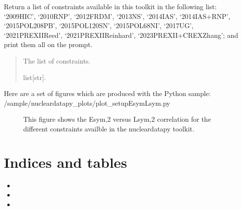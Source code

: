 \documentclass[letterpaper,10pt,english]{sphinxmanual}
\begin{document}

\begin{fulllineitems}
\label{\detokenize{source/api/setup_EsymLsym:nucleardatapy.setup_EsymLsym.constraints_EsymLsym}}
\pysigstartsignatures
{}
\pysigstopsignatures
\sphinxAtStartPar
Return a list of constraints available in this toolkit in the     following list: ‘2009\sphinxhyphen{}HIC’, ‘2010\sphinxhyphen{}RNP’, ‘2012\sphinxhyphen{}FRDM’, ‘2013\sphinxhyphen{}NS’,     ‘2014\sphinxhyphen{}IAS’, ‘2014\sphinxhyphen{}IAS+RNP’, ‘2015\sphinxhyphen{}POL\sphinxhyphen{}208PB’, ‘2015\sphinxhyphen{}POL\sphinxhyphen{}120SN’,     ‘2015\sphinxhyphen{}POL\sphinxhyphen{}68NI’, ‘2017\sphinxhyphen{}UG’, ‘2021\sphinxhyphen{}PREXII\sphinxhyphen{}Reed’,     ‘2021\sphinxhyphen{}PREXII\sphinxhyphen{}Reinhard’, ‘2023\sphinxhyphen{}PREXII+CREX\sphinxhyphen{}Zhang’; and     print them all on the prompt.
\begin{quote}\begin{description}
\sphinxAtStartPar
The list of constraints.

\sphinxAtStartPar
list{[}str{]}.

\end{description}\end{quote}

\end{fulllineitems}


\sphinxAtStartPar
Here are a set of figures which are produced with the Python sample: /sample/nucleardatapy\_plots/plot\_setupEsymLsym.py

\begin{figure}[htbp]
\centering
\capstart

\noindent{}
\caption{This figure shows the Esym,2 versus Lsym,2 correlation for the different constraints availble in the nucleardatapy toolkit.}\label{\detokenize{source/api/setup_EsymLsym:id1}}\end{figure}


\chapter{Indices and tables}
\label{\detokenize{index:indices-and-tables}}\begin{itemize}
\item {} 
\sphinxAtStartPar
{}

\item {} 
\sphinxAtStartPar
{}

\item {} 
\sphinxAtStartPar
{}

\end{itemize}
\end{document}
